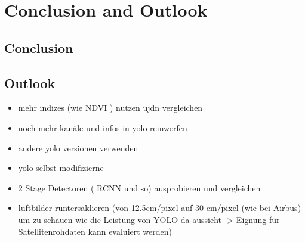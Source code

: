 \chapter{Conclusion and Outlook}
\label{ch:conclusion}

\section{Conclusion}
\section{Outlook}
\begin{itemize}
    \item mehr indizes (wie NDVI ) nutzen ujdn vergleichen
    \item noch mehr kanäle und infos in yolo reinwerfen
    \item andere yolo versionen verwenden
    \item yolo selbst modifizierne
    \item 2 Stage Detectoren ( RCNN und so) ausprobieren und vergleichen
    \item luftbilder runtersaklieren (von 12.5cm/pixel auf 30 cm/pixel (wie bei Airbus) um zu schauen wie die Leistung von YOLO da aussieht -> Eignung für Satellitenrohdaten kann evaluiert werden)
\end{itemize}

